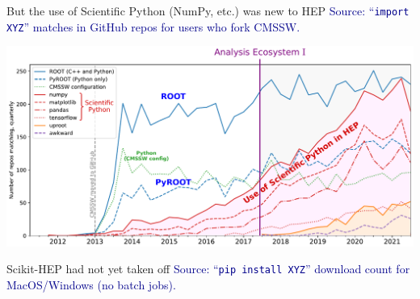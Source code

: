\documentclass[aspectratio=169]{beamer}
\begin{document}
\begin{frame}{But the use of Scientific Python (NumPy, etc.) was new to HEP}
\vspace{0.25 cm}
\textcolor{darkblue}{Source: ``\texttt{import XYZ}'' matches in GitHub repos for users who fork CMSSW.}

\includegraphics[width=\linewidth]{PLOTS/gihub-package-fullstudy-for-review.pdf}
\end{frame}

\begin{frame}{Scikit-HEP had not yet taken off}
\vspace{0.25 cm}
\textcolor{darkblue}{Source: ``\texttt{pip install XYZ}'' download count for MacOS/Windows (no batch jobs).}

\vspace{0.1 cm}
\end{frame}
\end{document}
